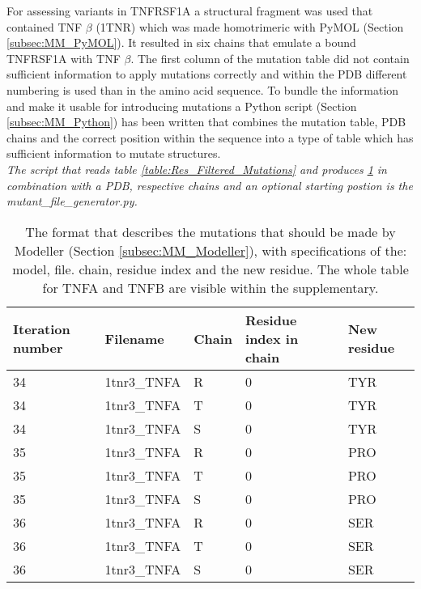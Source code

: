 	For assessing variants in TNFRSF1A a structural fragment was used that contained TNF $\beta$ (1TNR) \cite{banner_crystal_1993} which was made homotrimeric with PyMOL (Section \ref{subsec:MM_PyMOL}). 
	It resulted in six chains that emulate a bound TNFRSF1A with TNF $\beta$. 
	The first column of the mutation table did not contain sufficient information to apply mutations correctly and within the PDB different numbering is used than in the amino acid sequence. 
	To bundle the information and make it usable for introducing mutations a Python script (Section \ref{subsec:MM_Python}) has been written that combines the mutation table, PDB chains and the correct position within the sequence into a type of table which has sufficient information to mutate structures.\\ 
	\textit{The script that reads table \ref{table:Res_Filtered_Mutations} and produces \ref{table:Res_Modeller_Mutation_Format} in combination with a PDB, respective chains and an optional starting postion is the mutant\_file\_generator.py.} 
	\begin{table}[ht]
		\begin{tabular}{ l | l | l | l | l}
			Iteration number & Filename & Chain & Residue index in chain & New residue\\ \hline
			34 & 1tnr3\_TNFA & R & 0 & TYR\\
			34 & 1tnr3\_TNFA & T & 0 & TYR\\
			34 & 1tnr3\_TNFA & S & 0 & TYR\\
			35 & 1tnr3\_TNFA & R & 0 & PRO\\
			35 & 1tnr3\_TNFA & T & 0 & PRO\\
			35 & 1tnr3\_TNFA & S & 0 & PRO\\
			36 & 1tnr3\_TNFA & R & 0 & SER\\
			36 & 1tnr3\_TNFA & T & 0 & SER\\
			36 & 1tnr3\_TNFA & S & 0 & SER\\
		\end{tabular}
		\caption[Sample of the TNFRSF1A PDB residue mutation table]{The format that describes the mutations that should be made by Modeller (Section \ref{subsec:MM_Modeller}), with specifications of the: model, file. chain, residue index and the new residue. The whole table for TNFA and TNFB are visible within the supplementary.}
			\label{table:Res_Modeller_Mutation_Format}
	\end{table}
	
